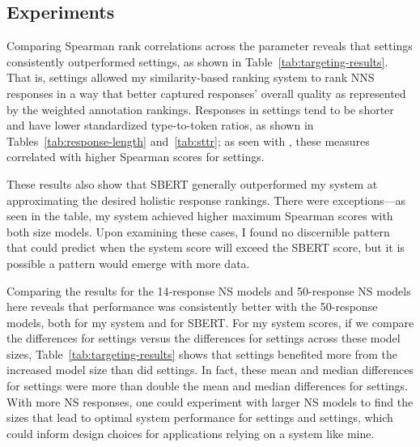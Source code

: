 \subsection{ Experiments}
\label{sec:exp-targeting}

Comparing Spearman rank correlations across the  parameter reveals that  settings consistently outperformed  settings, as shown in Table~\ref{tab:targeting-results}. That is,  settings allowed my similarity-based ranking system to rank NNS responses in a way that better captured responses' overall quality as represented by the weighted annotation rankings. Responses in  settings tend to be shorter and have lower standardized type-to-token ratios, as shown in Tables~\ref{tab:response-length} and~\ref{tab:sttr}; as seen with , these measures correlated with higher Spearman scores for  settings.

These results also show that SBERT generally outperformed my system at approximating the desired holistic response rankings. There were exceptions---as seen in the table, my system achieved higher maximum Spearman scores with both size models. Upon examining these cases, I found no discernible pattern that could predict when the system score will exceed the SBERT score, but it is possible a pattern would emerge with more data.

Comparing the results for the 14-response NS models and 50-response NS models here reveals that performance was consistently better with the 50-response models, both for my system and for SBERT. For my system scores, if we compare the differences for  settings versus the differences for  settings across these model sizes, Table~\ref{tab:targeting-results} shows that  settings benefited more from the increased model size than did  settings. In fact, these mean and median differences for  settings were more than double the mean and median differences for  settings.
With more NS responses, one could experiment with larger NS models to find the sizes that lead to optimal system performance for  settings and  settings, which could inform design choices for applications relying on a system like mine.

